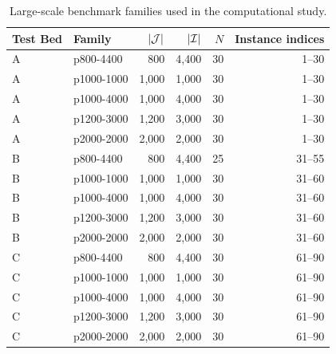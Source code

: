 \begin{table}[htbp]
\centering
\caption{Large-scale benchmark families used in the computational study.}
\label{tab:instance_families}
\small
\setlength{\tabcolsep}{5pt}
\begin{tabular}{llrrrr}
\toprule
Test Bed & Family & $|\mathcal{J}|$ & $|\mathcal{I}|$ & $N$ & Instance indices \\
\midrule
A & p800-4400  &   800 & 4{,}400 & 30 & 1--30 \\
A & p1000-1000 & 1{,}000 & 1{,}000 & 30 & 1--30 \\
A & p1000-4000 & 1{,}000 & 4{,}000 & 30 & 1--30 \\
A & p1200-3000 & 1{,}200 & 3{,}000 & 30 & 1--30 \\
A & p2000-2000 & 2{,}000 & 2{,}000 & 30 & 1--30 \\
\midrule
B & p800-4400  &   800 & 4{,}400 & 25 & 31--55 \\
B & p1000-1000 & 1{,}000 & 1{,}000 & 30 & 31--60 \\
B & p1000-4000 & 1{,}000 & 4{,}000 & 30 & 31--60 \\
B & p1200-3000 & 1{,}200 & 3{,}000 & 30 & 31--60 \\
B & p2000-2000 & 2{,}000 & 2{,}000 & 30 & 31--60 \\
\midrule
C & p800-4400  &   800 & 4{,}400 & 30 & 61--90 \\
C & p1000-1000 & 1{,}000 & 1{,}000 & 30 & 61--90 \\
C & p1000-4000 & 1{,}000 & 4{,}000 & 30 & 61--90 \\
C & p1200-3000 & 1{,}200 & 3{,}000 & 30 & 61--90 \\
C & p2000-2000 & 2{,}000 & 2{,}000 & 30 & 61--90 \\
\bottomrule
\end{tabular}
\end{table}

